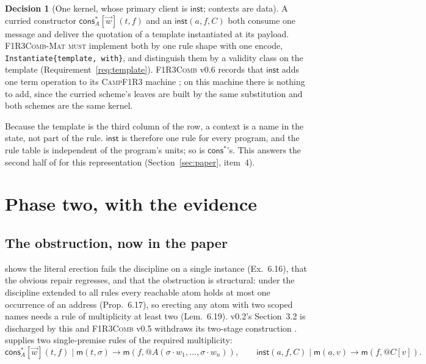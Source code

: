 \documentclass[11pt,a4paper]{article}
\makeatletter
\newcommand{\code}[1]{\texttt{#1}}
\newcommand{\Comb}{\textsc{F1R3Comb}}
\newcommand{\Mat}{\textsc{F1R3Comb-Mat}}
\newcommand{\Camp}{\textsc{CampF1R3}}
\newcommand{\MUST}{\textsc{must}}
\newcommand{\quo}[1]{@#1}
\newcommand{\red}{\longrightarrow}
\newcommand{\mm}{\mathsf{m}}
\theoremstyle{definition}
\newtheorem{decision}[definition]{Decision}
\theoremstyle{plain}
\newcommand{\inst}{\mathsf{inst}}
\newcommand{\cstar}{\mathsf{cons}^{*}}
\makeatother
\begin{document}
\begin{decision}[One kernel, whose primary client is $\inst$; contexts are data]
\label{dec:onekernel}
A curried constructor $\cstar_{A}[\vec w](t,f)$ and an $\inst(a,f,C)$ both
consume one message and deliver the quotation of a template instantiated at
its payload. \Mat{} \MUST{} implement both by one rule shape with one encode,
\code{Instantiate\{template, with\}}, and distinguish them by a validity class
on the template (Requirement~\ref{req:template}). \Comb{} v0.6 records that
$\inst$ adds one term operation to its \Camp{} machine
\cite[Rem.~9.2]{combspec}; on this machine there is nothing to add, since the
curried scheme's leaves are built by the same substitution and both schemes
are the same kernel.

Because the template is the third column of the row, a context is a name in
the state, not part of the rule. $\inst$ is therefore one rule for every
program, and the rule table is independent of the program's units; so is
$\cstar$'s. This answers the second half of \cite[\S15, item~5]{combspec} for
this representation (Section~\ref{sec:paper}, item~4).
\end{decision}

\section{Phase two, with the evidence}\label{sec:evidence}

\subsection{The obstruction, now in the paper}

\cite[\S6.6]{draft3} shows the literal erection fails the discipline on a
single instance (Ex.~6.16), that the obvious repair regresses, and that the
obstruction is structural: under the discipline extended to all rules every
reachable atom holds at most one occurrence of an address
(Prop.~6.17), so erecting any atom with two scoped names needs a rule of
multiplicity at least two (Lem.~6.19). v0.2's Section~3.2 is discharged by
this and \Comb{} v0.5 withdraws its two-stage construction
\cite[Rem.~5.16]{combspec}. \cite[\S6.7]{draft3} supplies two single-premise
rules of the required multiplicity:
\[
  \cstar_{A}[\vec w](t,f) \mid \mm(t,\sigma) \red
  \mm(f,\quo{A(\sigma\!\cdot\!w_{1},\dots,\sigma\!\cdot\!w_{n})}),
  \qquad
  \inst(a,f,C) \mid \mm(a,v) \red \mm(f,\quo{C[v]}).
\]
\end{document}
